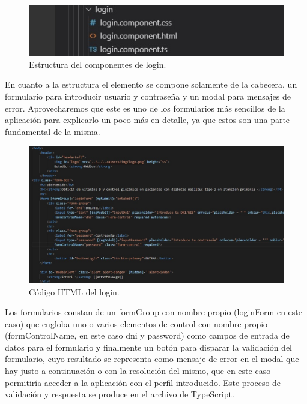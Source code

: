     \begin{figure}[h]
    \centering
     \includegraphics[width=1\textwidth]{images/loginComponent.jpg}
    \caption{Estructura del componentes de login.}
    \end{figure}
    \FloatBarrier
    
    En cuanto a la estructura el elemento se compone solamente de la cabecera, un formulario para introducir usuario y contraseña y un modal para mensajes de error. Aprovecharemos que este es uno de los formularios más sencillos de la aplicación para explicarlo un poco más en detalle, ya que estos son una parte fundamental de la misma.
    
    \begin{figure}[h]
    \centering
     \includegraphics[width=1\textwidth]{images/loginHTML.jpg}
    \caption{Código HTML del login.}
    \end{figure}
    \FloatBarrier
    
    Los formularios constan de un formGroup con nombre propio (loginForm en este caso) que engloba uno o varios elementos de control con nombre propio (formControlName, en este caso dni y password) como campos de entrada de datos para el formulario y finalmente un botón para disparar la validación del formulario, cuyo resultado se representa como mensaje de error en el modal que hay justo a continuación o con la resolución del mismo, que en este caso permitiría acceder a la aplicación con el perfil introducido. Este proceso de validación y respuesta se produce en el archivo de TypeScript.
 
